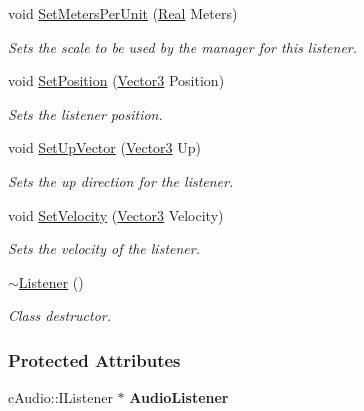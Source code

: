 \begin{DoxyCompactItemize}
void \hyperlink{classMezzanine_1_1Audio_1_1Listener_ab413b3d85270ff5ff816b4cc5c23554e}{SetMetersPerUnit} (\hyperlink{namespaceMezzanine_a726731b1a7df72bf3583e4a97282c6f6}{Real} Meters)
\begin{DoxyCompactList}\small\item\em Sets the scale to be used by the manager for this listener. \item\end{DoxyCompactList}\item 
void \hyperlink{classMezzanine_1_1Audio_1_1Listener_a88176e6cc43ba46337f445a58d1985a9}{SetPosition} (\hyperlink{classMezzanine_1_1Vector3}{Vector3} Position)
\begin{DoxyCompactList}\small\item\em Sets the listener position. \item\end{DoxyCompactList}\item 
void \hyperlink{classMezzanine_1_1Audio_1_1Listener_a0164474c3a9e10be3b040314e257bbc8}{SetUpVector} (\hyperlink{classMezzanine_1_1Vector3}{Vector3} Up)
\begin{DoxyCompactList}\small\item\em Sets the up direction for the listener. \item\end{DoxyCompactList}\item 
void \hyperlink{classMezzanine_1_1Audio_1_1Listener_abe15a6e98f8d04ecc82af40264a63170}{SetVelocity} (\hyperlink{classMezzanine_1_1Vector3}{Vector3} Velocity)
\begin{DoxyCompactList}\small\item\em Sets the velocity of the listener. \item\end{DoxyCompactList}\item 
\hypertarget{classMezzanine_1_1Audio_1_1Listener_a443af89e23007cb1c96acb1fe297ff9c}{
\hyperlink{classMezzanine_1_1Audio_1_1Listener_a443af89e23007cb1c96acb1fe297ff9c}{$\sim$Listener} ()}
\label{classMezzanine_1_1Audio_1_1Listener_a443af89e23007cb1c96acb1fe297ff9c}

\begin{DoxyCompactList}\small\item\em Class destructor. \item\end{DoxyCompactList}\end{DoxyCompactItemize}
\subsubsection*{Protected Attributes}
\begin{DoxyCompactItemize}
\item 
\hypertarget{classMezzanine_1_1Audio_1_1Listener_a16d39f3bed8cea05266899d4aa47d6b5}{
cAudio::IListener $\ast$ {\bfseries AudioListener}}
\label{classMezzanine_1_1Audio_1_1Listener_a16d39f3bed8cea05266899d4aa47d6b5}

\end{DoxyCompactItemize}


